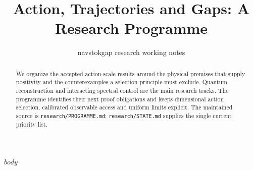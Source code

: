 \documentclass[11pt,a4paper]{article}
\title{Action, Trajectories and Gaps: A Research Programme}
\author{navstokgap research working notes}
\date{}
\begin{document}
\maketitle
\begin{abstract}
We organize the accepted action-scale results around the physical premises
that supply positivity and the counterexamples a selection principle must
exclude. Quantum reconstruction and interacting spectral control are the main
research tracks. The programme identifies their next proof obligations and
keeps dimensional action selection, calibrated observable access and uniform
limits explicit. The maintained source is \texttt{research/PROGRAMME.md};
\texttt{research/STATE.md} supplies the single current priority list.
\end{abstract}
$body$
\end{document}
